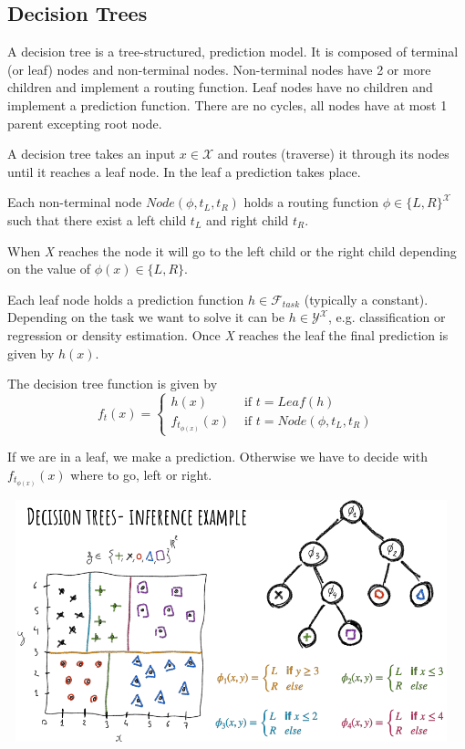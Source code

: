 \documentclass{article}
\begin{document}
\subsection*{Decision Trees}

A decision tree is a tree-structured, prediction model. It is composed of terminal (or leaf)  nodes and non-terminal nodes. Non-terminal nodes have 2 or more children and implement a routing function. Leaf nodes have no children and implement a prediction function. There are no cycles, all nodes have at most 1 parent excepting root node.

A decision tree takes an input \(x \in \mathcal{X}\) and routes (traverse) it through its nodes until it reaches a leaf node. In the leaf a prediction takes place.

Each non-terminal node \(Node(\phi, t_L, t_R)\) holds a routing function \(\phi \in \{L, R\}^{\mathcal{X}}\) such that there exist a left child \(t_L\) and right child \(t_R\).

When \emph{X} reaches the node it will go to the left child or the right child depending on the value of \(\phi(x) \in \{L, R\}\).


Each leaf node holds a prediction function \(h \in \mathcal{F}_{task}\) (typically a constant). Depending on the task we want to solve it can be \(h \in \mathcal{Y}^\mathcal{X}\), e.g. classification or regression or density estimation. Once \emph{X} reaches the leaf the final prediction is given by \(h(x)\).



The decision tree function is given by
\[f_t(x) = \left\{ \begin{array}{ll}
h(x) & \text{ if } t = Leaf(h)\\
f_{t_{\phi(x)}}(x) & \text{ if } t = Node(\phi, t_L, t_R)
\end{array}\right.\]

If we are in a leaf, we make a prediction. Otherwise we have to decide with \(f_{t_{\phi(x)}}(x)\) where to go, left or right.

\centering
\includegraphics[width=13cm, height=7cm]{img/decision_tree.png}
\end{document}
